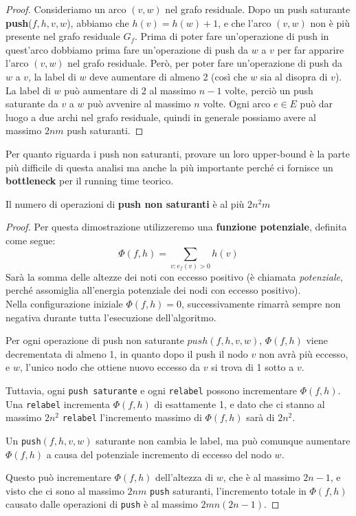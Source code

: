 \begin{proof}
      Consideriamo un arco $(v, w)$ nel grafo residuale. Dopo un push saturante
      \textbf{push}($f, h, v, w$), abbiamo che $h(v) = h(w) + 1$, e che l'arco $(v,
            w)$ non è più presente nel grafo residuale $G_f$. Prima di poter fare
      un'operazione di push in quest'arco dobbiamo prima fare un'operazione di push da
      $w$ a $v$ per far apparire l'arco $(v, w)$ nel grafo residuale. Però, per poter
      fare un'operazione di push da $w$ a $v$, la label di $w$ deve aumentare di
      almeno 2 (così che $w$ sia al disopra di $v$). La label di $w$ può aumentare di
      2 al massimo $n - 1$ volte, perciò un push saturante da $v$ a $w$ può avvenire
      al massimo $n$ volte. Ogni arco $e \in E$ può dar luogo a due archi nel grafo
      residuale, quindi in generale possiamo avere al massimo $2nm$ push saturanti.
\end{proof}


Per quanto riguarda i push non saturanti, provare un loro upper-bound è la parte
più difficile di questa analisi ma anche la più importante perché ci fornisce un
\textbf{bottleneck} per il running time teorico.

\begin{myblockquote}
      Il numero di operazioni di \textbf{push non saturanti} è al più $2n^2m$
\end{myblockquote}

\begin{proof}
      Per questa dimostrazione utilizzeremo una
      \textbf{funzione potenziale}, definita come segue:
      $$
            \Phi(f, h) = \sum_{v:e_f(v)>0}h(v)
      $$
      Sarà la somma delle altezze dei noti con eccesso positivo (è chiamata
      \textit{potenziale}, perché assomiglia all'energia potenziale dei nodi con
      eccesso positivo).\\

      Nella configurazione iniziale $\Phi(f, h) = 0$, successivamente rimarrà sempre
      non negativa durante tutta l'esecuzione dell'algoritmo.

      Per ogni operazione di push non saturante $push(f, h, v, w)$, $\Phi(f, h)$
      viene decrementata di almeno 1, in quanto dopo il push il nodo $v$ non avrà più
      eccesso, e $w$, l'unico nodo che ottiene nuovo eccesso da $v$ si trova di 1
      sotto a $v$.

      Tuttavia, ogni \texttt{push saturante} e ogni \texttt{relabel} possono
      incrementare $\Phi(f, h)$. Una \texttt{relabel} incrementa $\Phi(f, h)$ di
      esattamente 1, e dato che ci stanno al massimo $2n^2$ \texttt{relabel}
      l'incremento massimo di $\Phi(f, h)$ sarà di $2n^2$.

      Un \texttt{push}$(f, h, v, w)$ saturante non cambia le label, ma può comunque
      aumentare $\Phi(f, h)$ a causa del potenziale incremento di eccesso del nodo
      $w$.

      Questo può incrementare $\Phi(f, h)$ dell'altezza di $w$, che è al massimo
      $2n-1$, e visto che ci sono al massimo $2nm$ \texttt{push} saturanti,
      l'incremento totale  in $\Phi(f, h)$ causato dalle operazioni di \texttt{push} è
      al massimo $2mn(2n-1)$.
\end{proof}

